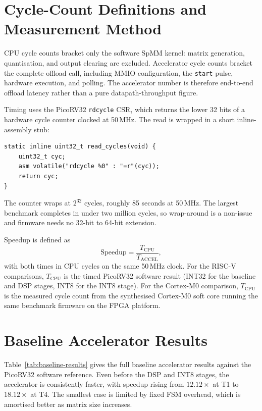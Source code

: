 \section{Cycle-Count Definitions and Measurement Method}
\label{sec:cycle-defs}

CPU cycle counts bracket only the software SpMM kernel: matrix
generation, quantisation, and output clearing are excluded. Accelerator
cycle counts bracket the complete offload call, including MMIO
configuration, the \texttt{start} pulse, hardware execution, and polling.
The accelerator number is therefore end-to-end offload latency rather
than a pure datapath-throughput figure.

Timing uses the PicoRV32 \texttt{rdcycle} CSR, which returns the lower
32 bits of a hardware cycle counter clocked at 50\,MHz. The read is
wrapped in a short inline-assembly stub:
\begin{verbatim}
static inline uint32_t read_cycles(void) {
    uint32_t cyc;
    asm volatile("rdcycle %0" : "=r"(cyc));
    return cyc;
}
\end{verbatim}

The counter wraps at $2^{32}$ cycles, roughly 85 seconds at 50\,MHz.
The largest benchmark completes in under two million cycles, so
wrap-around is a non-issue and firmware needs no 32-bit to 64-bit
extension.

Speedup is defined as
\[
  \text{Speedup} = \frac{T_{\mathrm{CPU}}}{T_{\mathrm{ACCEL}}},
\]
with both times in CPU cycles on the same 50\,MHz clock. For the
RISC-V comparisons, $T_{\mathrm{CPU}}$ is the timed PicoRV32 software
result (INT32 for the baseline and DSP stages, INT8 for the INT8
stage). For the Cortex-M0 comparison, $T_{\mathrm{CPU}}$ is the
measured cycle count from the synthesised Cortex-M0 soft core running
the same benchmark firmware on the FPGA platform.

\section{Baseline Accelerator Results}

Table~\ref{tab:baseline-results} gives the full baseline accelerator
results against the PicoRV32 software reference. Even before the DSP
and INT8 stages, the accelerator is consistently faster, with speedup
rising from $12.12\times$ at T1 to $18.12\times$ at T4. The smallest
case is limited by fixed FSM overhead, which is amortised better as
matrix size increases.


